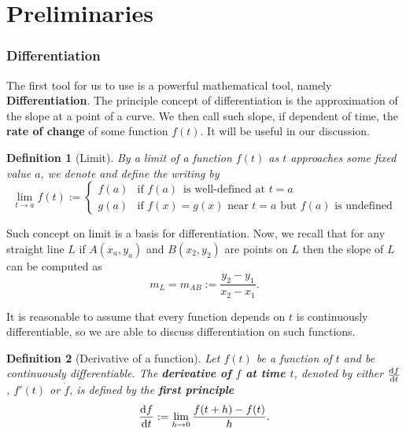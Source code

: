 \documentclass[12pt]{article}
\newtheorem{definition}{Definition}[section]
\begin{document}
    \begin{abstract}
        Physics, as a newly introduced subject apart from junior secondary, its concepts are relatively complicated when there is a lost of mathematical tools and insufficient explanations. In this set of notes, we will go through the concepts in Highschool physics with more mathematical tools.
    \end{abstract}

    \tableofcontents
    \newpage

    \section{Preliminaries}

    \subsubsection*{Differentiation}

    The first tool for us to use is a powerful mathematical tool, namely \textbf{Differentiation}. The principle concept of differentiation is the approximation of the slope at a point of a curve. We then call such slope, if dependent of time, the \textbf{rate of change} of some function $f(t)$. It will be useful in our discussion.

    \begin{definition}[Limit]
        By a limit of a function $f(t)$ as $t$ approaches some fixed value $a$, we denote and define the writing by \[\lim_{t\to a}f(t):=\begin{cases}
            f(a)&\textrm{if } f(a)\,\textrm{ is well-defined at }t=a\\
            g(a)&\textrm{if } f(x)=g(x) \textrm{ near } t=a \textrm{ but } f(a) \textrm{ is undefined}
        \end{cases}\]
    \end{definition}

    Such concept on limit is a basis for differentiation. Now, we recall that for any straight line $L$ if $A(x_a,y_a)$ and $B(x_2,y_2)$ are points on $L$ then the slope of $L$ can be computed as \[m_L=m_{AB}:=\frac{y_2-y_1}{x_2-x_1}.\]

    It is reasonable to assume that every function depends on $t$ is continuously differentiable, so we are able to discuss differentiation on such functions.

    \begin{definition}[Derivative of a function]
        Let $f(t)$ be a function of $t$ and be continuously differentiable. The \textbf{derivative of $f$ at time $t$}, denoted by either $\derivative{f}{t}$, $f'(t)$ or $\Dot{f}$, is defined by the \textbf{first principle} \[\derivative{f}{t}:=\lim_{h\to 0}\dfrac{f(t+h)-f(t)}{h}.\]
    \end{definition}
\end{document}
